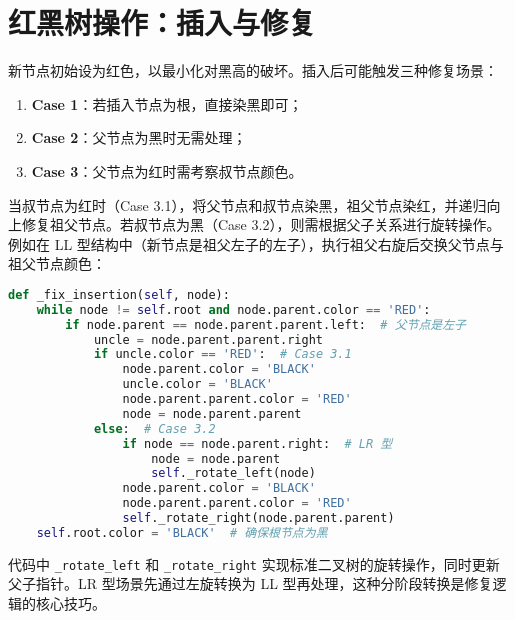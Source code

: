 \chapter{红黑树操作：插入与修复}
新节点初始设为红色，以最小化对黑高的破坏。插入后可能触发三种修复场景：\par
\begin{enumerate}
\item \textbf{Case 1}：若插入节点为根，直接染黑即可；
\item \textbf{Case 2}：父节点为黑时无需处理；
\item \textbf{Case 3}：父节点为红时需考察叔节点颜色。
\end{enumerate}
当叔节点为红时（Case 3.1），将父节点和叔节点染黑，祖父节点染红，并递归向上修复祖父节点。若叔节点为黑（Case 3.2），则需根据父子关系进行旋转操作。例如在 LL 型结构中（新节点是祖父左子的左子），执行祖父右旋后交换父节点与祖父节点颜色：\par
\begin{lstlisting}[language=python]
def _fix_insertion(self, node):
    while node != self.root and node.parent.color == 'RED':
        if node.parent == node.parent.parent.left:  # 父节点是左子
            uncle = node.parent.parent.right
            if uncle.color == 'RED':  # Case 3.1
                node.parent.color = 'BLACK'
                uncle.color = 'BLACK'
                node.parent.parent.color = 'RED'
                node = node.parent.parent
            else:  # Case 3.2
                if node == node.parent.right:  # LR 型
                    node = node.parent
                    self._rotate_left(node)
                node.parent.color = 'BLACK'
                node.parent.parent.color = 'RED'
                self._rotate_right(node.parent.parent)
    self.root.color = 'BLACK'  # 确保根节点为黑
\end{lstlisting}
代码中 \texttt{\_{}rotate\_{}left} 和 \texttt{\_{}rotate\_{}right} 实现标准二叉树的旋转操作，同时更新父子指针。LR 型场景先通过左旋转换为 LL 型再处理，这种分阶段转换是修复逻辑的核心技巧。\par
